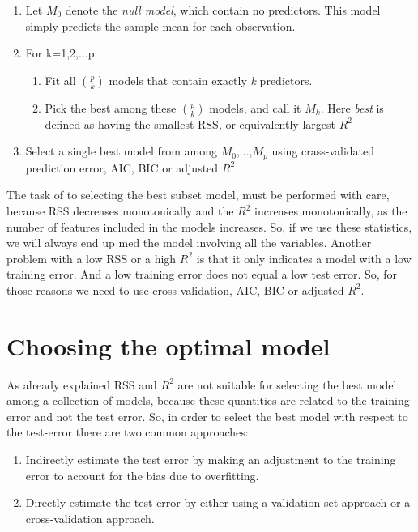 \begin{enumerate}
	\item Let $M_0$ denote the \textit{null model}, which contain no predictors. This model simply predicts the sample mean for each observation.
	
	\item For k=1,2,...p:
	\begin{enumerate}
		\item Fit all $\binom{p}{k}$ models that contain exactly \textit{k} predictors.
		
		\item Pick the best among these $\binom{p}{k}$ models, and call it $M_k$. Here \textit{best} is defined as having the smallest RSS, or equivalently largest $R^2$
	\end{enumerate}
	\item Select a single best model from among $M_0$,...,$M_p$ using crass-validated prediction error, AIC, BIC or adjusted $R^2$
\end{enumerate}


The task of to selecting the best subset model, must be performed with care, because RSS decreases monotonically and the $R^2$ increases monotonically, as the number of features included in the models increases. So, if we use these statistics, we will always end up med the model involving all the variables. 
Another problem with a low RSS or a high $R^2$ is that it only indicates a model with a low training error. And a low training error does not equal a low test error. So, for those reasons we need to use cross-validation, AIC, BIC or adjusted $R^2$. 

\section{Choosing the optimal model}
As already explained RSS and $R^2$ are not suitable for selecting the best model among a collection of models, because these quantities are related to the training error and not the test error. 
So, in order to select the best model with respect to the test-error there are two common approaches:

\begin{enumerate}
	\item Indirectly estimate the test error by making an adjustment to the training error to account for the bias due to overfitting.
	
	\item Directly estimate the test error by either using a validation set approach or a cross-validation approach. 

\end{enumerate}


